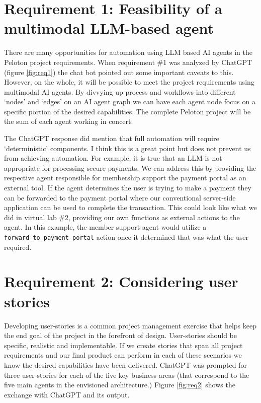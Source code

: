 \documentclass[11pt,letterpaper]{article}
\begin{document}
\section*{Requirement 1: Feasibility of a multimodal LLM-based agent}
\tab There are many opportunities for automation using LLM based AI agents in the Peloton project requirements.
When requirement \#1 was analyzed by ChatGPT (figure \ref{fig:req1}) the chat bot pointed out some important caveats to this.
However, on the whole, it will be possible to meet the project requirements using multimodal AI agents. By divvying up process and workflows into
different `nodes' and `edges' on an AI agent graph we can have each agent node focus on a specific portion of the desired capabilities.
The complete Peloton project will be the sum of each agent working in concert.

The ChatGPT response did mention that full automation will require `deterministic' components. I think this is a great point but does not prevent us from achieving automation. For example, it is true that an LLM is not appropriate for processing secure payments. We can address this by providing the respective agent responsible for membership support the payment portal as an external tool. If the agent determines the user is trying to make a payment they can be forwarded to the payment portal where our conventional server-side application can be used to complete the transaction.
This could look like what we did in virtual lab \#2, providing our own functions as external actions to the agent. In this example, the member support agent would utilize a \texttt{forward\_to\_payment\_portal} action once it determined that was what the user required.

\section*{Requirement 2: Considering user stories}
\tab Developing user-stories is a common project management exercise that helps keep the end goal of the project in the forefront of design.
User-stories should be specific, realistic and implementable. If we create stories that span all project requirements and our final product can perform in each of these scenarios we know the desired capabilities have been delivered. ChatGPT was prompted for three user-stories for each of the five key business areas (that correspond to the five main agents in the envisioned architecture.) Figure \ref{fig:req2} shows the exchange with ChatGPT and its output.
\end{document}
